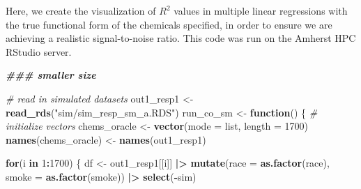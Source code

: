 \documentclass[12pt, twoside]{amherstthesis}
\newenvironment{Shaded}{\begin{snugshade}}{\end{snugshade}}
\newcommand{\AttributeTok}[1]{\textcolor[rgb]{0.13,0.29,0.53}{#1}}
\newcommand{\CommentTok}[1]{\textcolor[rgb]{0.56,0.35,0.01}{\textit{#1}}}
\newcommand{\ControlFlowTok}[1]{\textcolor[rgb]{0.13,0.29,0.53}{\textbf{#1}}}
\newcommand{\DecValTok}[1]{\textcolor[rgb]{0.00,0.00,0.81}{#1}}
\newcommand{\DocumentationTok}[1]{\textcolor[rgb]{0.56,0.35,0.01}{\textbf{\textit{#1}}}}
\newcommand{\FunctionTok}[1]{\textcolor[rgb]{0.13,0.29,0.53}{\textbf{#1}}}
\newcommand{\NormalTok}[1]{#1}
\newcommand{\OtherTok}[1]{\textcolor[rgb]{0.56,0.35,0.01}{#1}}
\newcommand{\SpecialCharTok}[1]{\textcolor[rgb]{0.81,0.36,0.00}{\textbf{#1}}}
\newcommand{\StringTok}[1]{\textcolor[rgb]{0.31,0.60,0.02}{#1}}
\begin{document}
Here, we create the visualization of \(R^2\) values in multiple linear regressions with the true functional form of the chemicals specified, in order to ensure we are achieving a realistic signal-to-noise ratio. This code was run on the Amherst HPC RStudio server.

\scriptsize
\begin{Shaded}
\begin{Highlighting}[]
\DocumentationTok{\#\#\# smaller size}

\CommentTok{\# read in simulated datasets}
\NormalTok{out1\_resp1 }\OtherTok{\textless{}{-}} \FunctionTok{read\_rds}\NormalTok{(}\StringTok{"sim/sim\_resp\_sm\_a.RDS"}\NormalTok{)}
\NormalTok{run\_co\_sm }\OtherTok{\textless{}{-}} \ControlFlowTok{function}\NormalTok{() \{}
  \CommentTok{\# initialize vectors}
\NormalTok{  chems\_oracle }\OtherTok{\textless{}{-}} \FunctionTok{vector}\NormalTok{(}\AttributeTok{mode =} \StringTok{\textquotesingle{}list\textquotesingle{}}\NormalTok{, }\AttributeTok{length =} \DecValTok{1700}\NormalTok{) }
  \FunctionTok{names}\NormalTok{(chems\_oracle) }\OtherTok{\textless{}{-}} \FunctionTok{names}\NormalTok{(out1\_resp1)}
  
  \ControlFlowTok{for}\NormalTok{(i }\ControlFlowTok{in} \DecValTok{1}\SpecialCharTok{:}\DecValTok{1700}\NormalTok{) \{}
\NormalTok{    df }\OtherTok{\textless{}{-}}\NormalTok{ out1\_resp1[[i]] }\SpecialCharTok{|\textgreater{}} 
      \FunctionTok{mutate}\NormalTok{(}\AttributeTok{race =} \FunctionTok{as.factor}\NormalTok{(race), }\AttributeTok{smoke =} \FunctionTok{as.factor}\NormalTok{(smoke)) }\SpecialCharTok{|\textgreater{}} 
      \FunctionTok{select}\NormalTok{(}\SpecialCharTok{{-}}\NormalTok{sim)}
    

\end{Highlighting}
\end{Shaded}
\end{document}

